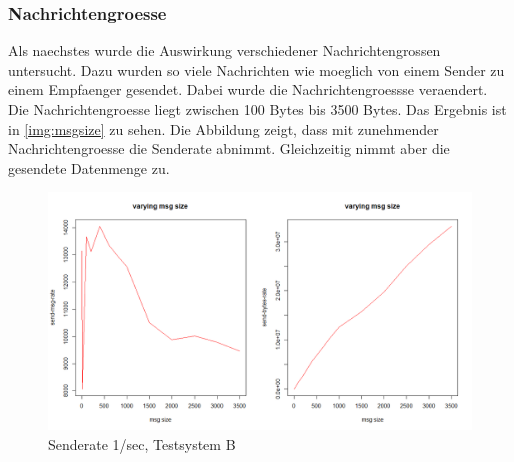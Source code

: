 \subsubsection{Nachrichtengroesse}
Als naechstes wurde die Auswirkung verschiedener Nachrichtengrossen untersucht. Dazu wurden so viele Nachrichten wie moeglich von einem Sender zu einem Empfaenger gesendet. Dabei wurde die Nachrichtengroessse veraendert. Die Nachrichtengroesse liegt zwischen 100 Bytes bis 3500 Bytes. 
Das Ergebnis ist in \autoref{img:msgsize} zu sehen. Die Abbildung zeigt, dass mit zunehmender Nachrichtengroesse die Senderate abnimmt. Gleichzeitig nimmt aber die gesendete Datenmenge zu.
\begin{figure}
\center
  \includegraphics[width=1\textwidth]{images/msg-size.png}
  \caption{Senderate 1/sec, Testsystem B}
  \label{img:msgsize}
\end{figure}

